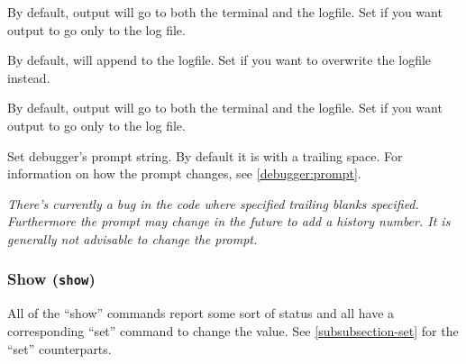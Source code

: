 \begin{description}
By default,  output will go to both the terminal and the
logfile.  Set  if you want output to go only to the log
file.

\item[set logging overwrite on\code{\Large{|}}off]\label{command:log-overwrite}

By default,  will append to the logfile.  Set
 if you want  to overwrite the
logfile instead.

\item[set logging redirect on\code{\Large{|}}off]\label{command:log-redirect}

By default,  output will go to both the terminal and the
logfile.  Set  if you want output to go only to the log
file.

\item[set prompt \var{prompt-string}]\label{command:prompt}

Set debugger's prompt string. By default it is  with
a trailing space. For information on how the prompt
changes, see \ref{debugger:prompt}.

\emph{There's currently a bug in the code where specified trailing
blanks specified. Furthermore the prompt may change in the future to
add a history number. It is generally not advisable to change the
prompt.}

\end{description}

\subsubsection{Show ({\tt show}) \label{subsubsection-show}}

All of the ``show'' commands report some sort of status and all have a
corresponding ``set'' command to change the value. See
\ref{subsubsection-set} for the ``set'' counterparts.

